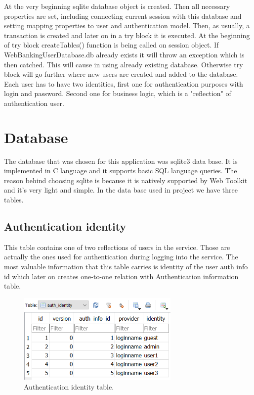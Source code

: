 \documentclass[a4paper,12pt]{book}
\begin{document}
\bigskip
At the very beginning sqlite database object is created. Then all necessary properties are set, including connecting current session with this database and setting mapping properties to user and authentication model. Then, as usually, a transaction is created and later on in a try block it is executed. At the beginning of try block createTables() function is being called on session object. If WebBankingUserDatabase.db already exists it will throw an exception which is then catched. This will cause in using already existing database. Otherwise try block will go further where new users are created and added to the database. Each user has to have two identities, first one for authentication purposes with login and password. Second one for business logic, which is a "reflection" of authentication user. 


\section{Database}
The database that was chosen for this application was sqlite3 data base. It is implemented in C language and it supports basic SQL language queries. The reason behind choosing sqlite is because it is natively supported by Web Toolkit and it's very light and simple. In the data base used in project we have three tables.

\subsection*{Authentication identity}
{
This table contains one of two reflections of users in the service. Those are actually the ones used for authentication during logging into the service. The most valuable information that this table carries is identity of the user auth info id which later on creates one-to-one relation with Authentication information table.

\begin{figure}[H]
\centering
\includegraphics[width=0.7\textwidth]{auth_identity}
\caption{Authentication identity table.}
\end{figure}

}
\end{document}
